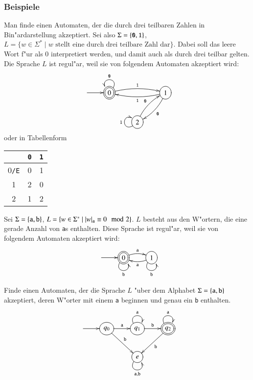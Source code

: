 \subsubsection{Beispiele}
\begin{beispiel} 
Man finde einen Automaten, der die durch drei teilbaren Zahlen in
Bin"ardarstellung akzeptiert.
Sei also $\Sigma=\{{\tt 0},{\tt 1}\}$,
$L=\{w\in\Sigma^*\;|\; \text{$w$ stellt eine durch drei teilbare Zahl dar}\}.$
Dabei soll das leere Wort f"ur als $0$
interpretiert werden, und damit auch als durch drei teilbar gelten.
Die Sprache $L$ ist regul"ar, weil sie
von folgendem Automaten akzeptiert wird:
\[
\entrymodifiers={++[o][F]}
\xymatrix{
*+\txt{} \ar[r]
	&*++[o][F=]{0} \ar@/^/[rr]^{\tt 1} \ar@(ur,ul)_{\tt 0}
		&*+\txt{}
			&{1} \ar@/^/[dl]^{\tt 0}  \ar@/^/[ll]^{\tt 1}
\\
*+\txt{}
	&*+\txt{}
		&2\ar@/^/[ur]^{\tt 0} \ar@(dl,ul)^{\tt 1}
}
\]
oder in Tabellenform
\begin{center}
\begin{tabular}{|c|cc|}
\hline
&\tt 0&\tt 1\\
\hline
0{\tt /E}&0&1\\
1        &2&0\\
2        &1&2\\
\hline
\end{tabular}
\end{center}
\end{beispiel}

\begin{beispiel}
Sei $\Sigma=\{{\tt a},{\tt b}\}$,
$L=\{w\in\Sigma^*\;|\; |w|_{\tt a}\equiv 0\mod 2\}$. $L$ besteht aus
den W"ortern, die  eine gerade Anzahl von {\tt a}s enthalten. Diese
Sprache ist regul"ar, weil sie von folgendem Automaten akzeptiert wird:
\[
\entrymodifiers={++[o][F]}
\xymatrix{
*+\txt{} \ar[r]
	&*++[o][F=]{0}\ar@/^/[r]^{\tt a} \ar@(dl,dr)_{\tt b}
		&1 \ar@/^/[l]^{\tt a} \ar@(dl,dr)_{\tt b}
}
\]
\end{beispiel}

\begin{beispiel}
Finde einen Automaten, der die Sprache $L$ "uber dem Alphabet
$\Sigma=\{{\tt a},{\tt b}\}$ akzeptiert, deren W"orter mit 
einem {\tt a} beginnen und genau ein {\tt b} enthalten.
\[
\entrymodifiers={++[o][F]}
\xymatrix{
*+\txt{} \ar[r]
	&{q_0} \ar[r]^{\tt a} \ar[dr]^{\tt b}
		&{q_1} \ar@(ul,ur)^{\tt a} \ar[r]^{\tt b}
			&*++[o][F=]{q_2}\ar@(ul,ur)^{\tt a}  \ar[dl]^{\tt b}
\\
*+\txt{}
	&*+\txt{}
		&{e}\ar@(dl,dr)_{{\tt a},{\tt b}}
}
\]
\end{beispiel}

